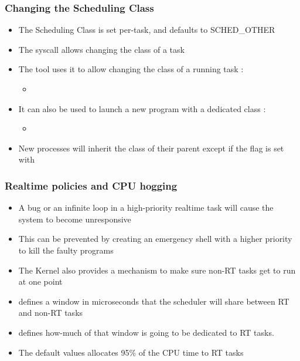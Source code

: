 \begin{frame}
	\frametitle{Changing the Scheduling Class}
	\begin{itemize}
		\item The Scheduling Class is set per-task, and defaults to SCHED\_OTHER
		\item The  syscall allows changing the class of a task
		\item The tool  uses it to allow changing the class of a running task :
			\begin{itemize}
				\item {}
			\end{itemize}
		\item It can also be used to launch a new program with a dedicated class :
			\begin{itemize}
				\item {}
			\end{itemize}
		\item New processes will inherit the class of their parent except if the  flag is set with 
	\end{itemize}
\end{frame}

\begin{frame}
	\frametitle{Realtime policies and CPU hogging}
	\begin{itemize}
		\item A bug or an infinite loop in a high-priority realtime task will cause the system to become unresponsive
		\item This can be prevented by creating an emergency shell with a higher priority to kill the faulty programs
		\item The Kernel also provides a mechanism to make sure non-RT tasks get to run at one point
		\item {} defines a window in microseconds that the scheduler will share between RT and non-RT tasks
		\item {} defines how-much of that window is going to be dedicated to RT tasks.
		\item The default values allocates 95\% of the CPU time to RT tasks
	\end{itemize}
\end{frame}

